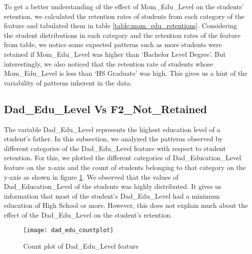 \documentclass[11pt,openright]{report}
\begin{document}
To get a better understanding of the effect of Mom\_Edu\_Level on the students' retention, we calculated the retention rates of students from each category of the feature and tabulated them in table \ref{table:mom_edu_retentions}. Considering the student distributions in each category and the retention rates of the feature from table, we notice some expected patterns such as more students were retained if Mom\_Edu\_Level was higher than `Bachelor Level Degree'. But interestingly, we also noticed that the retention rate of students whose Mom\_Edu\_Level is less than `HS Graduate' was high. This gives us a hint of the variability of patterns inherent in the data.


\subsection {Dad\_Edu\_Level Vs F2\_Not\_Retained}
The variable Dad\_Edu\_Level represents the highest education level of a student's father. In this subsection, we analyzed the patterns observed by different categories of the Dad\_Edu\_Level feature with respect to student retention. For this, we plotted the different categories of Dad\_Education\_Level feature on the x-axis and the count of students belonging to that category on the y-axis as shown in figure \ref{fig:dad_edu_F2NotRetained_plot}. We observed that the values of Dad\_Education\_Level of the students was highly distributed. It gives us information that most of the student's Dad\_Edu\_Level had a minimum education of High School or more. However, this does not explain much about the effect of the Dad\_Edu\_Level on the student's retention.


\begin{figure}[!ht]
	\centering
	\texttt{[image: dad\_edu\_countplot]}
	\caption{Count plot of Dad\_Edu\_Level feature }
	\label{fig:dad_edu_F2NotRetained_plot}
\end{figure}
\end{document}

